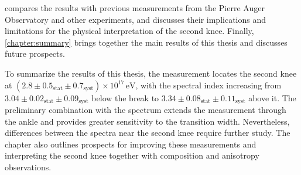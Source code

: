 \documentclass[main.tex]{subfiles}
\begin{document}
 compares the results with previous measurements from the Pierre Auger Observatory and other experiments, and discusses their implications and limitations for the physical interpretation of the second knee.
Finally, \cref{chapter:summary} brings together the main results of this thesis and discusses future prospects.

To summarize the results of this thesis, the  measurement locates the second knee at $(2.8\pm0.5_{\mathrm{stat}}\pm0.7_{\mathrm{syst}})\times10^{17}\,\mathrm{eV}$, with the spectral index increasing from $3.04\pm0.02_{\mathrm{stat}}\pm0.09_{\mathrm{syst}}$ below the break to $3.34\pm0.08_{\mathrm{stat}}\pm0.11_{\mathrm{syst}}$ above it.
The preliminary combination with the  spectrum extends the measurement through the ankle and provides greater sensitivity to the transition width.
Nevertheless, differences between the spectra near the second knee require further study.
The chapter also outlines prospects for improving these measurements and interpreting the second knee together with composition and anisotropy observations.
\end{document}
